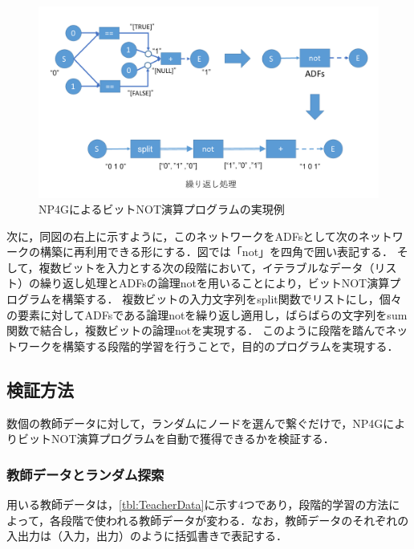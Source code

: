 \documentclass[exploratorypaper]{jsaiart} %
\begin{document}
\begin{figure}[t]
    \begin{center}
        \includegraphics[width=150mm]{bitwise_not.png}
    \end{center}
    \capwidth=130mm %
    \caption{NP4GによるビットNOT演算プログラムの実現例}
    \label{fig:bitwise_not}
\end{figure}

次に，同図の右上に示すように，このネットワークをADFsとして次のネットワークの構築に再利用できる形にする．図では「not」を四角で囲い表記する．
そして，複数ビットを入力とする次の段階において，イテラブルなデータ（リスト）の繰り返し処理とADFsの論理notを用いることにより，ビットNOT演算プログラムを構築する．
複数ビットの入力文字列をsplit関数でリストにし，個々の要素に対してADFsである論理notを繰り返し適用し，ばらばらの文字列をsum関数で結合し，複数ビットの論理notを実現する．
このように段階を踏んでネットワークを構築する段階的学習を行うことで，目的のプログラムを実現する．

\subsection{検証方法}
数個の教師データに対して，ランダムにノードを選んで繋ぐだけで，NP4GによりビットNOT演算プログラムを自動で獲得できるかを検証する．

\subsubsection{教師データとランダム探索}
用いる教師データは，\ref{tbl:TeacherData}に示す4つであり，段階的学習の方法によって，各段階で使われる教師データが変わる．なお，教師データのそれぞれの入出力は（入力，出力）のように括弧書きで表記する．
\end{document}
